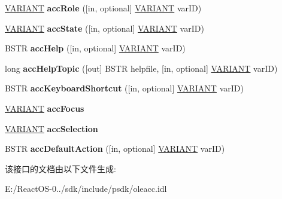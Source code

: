\begin{DoxyCompactItemize}
\mbox{\label{interface_i_accessible_a6944b25c49a0bbd468c0913894962a80}} 
\hyperlink{structtag_v_a_r_i_a_n_t}{V\+A\+R\+I\+A\+NT} {\bfseries acc\+Role} (\mbox{[}in, optional\mbox{]} \hyperlink{structtag_v_a_r_i_a_n_t}{V\+A\+R\+I\+A\+NT} var\+ID)
\item 
\mbox{\label{interface_i_accessible_a1ea262b68b4bf4f5802f343eeccb0ba7}} 
\hyperlink{structtag_v_a_r_i_a_n_t}{V\+A\+R\+I\+A\+NT} {\bfseries acc\+State} (\mbox{[}in, optional\mbox{]} \hyperlink{structtag_v_a_r_i_a_n_t}{V\+A\+R\+I\+A\+NT} var\+ID)
\item 
\mbox{\label{interface_i_accessible_adff5ec59aafb33b34195465f575bd0c7}} 
B\+S\+TR {\bfseries acc\+Help} (\mbox{[}in, optional\mbox{]} \hyperlink{structtag_v_a_r_i_a_n_t}{V\+A\+R\+I\+A\+NT} var\+ID)
\item 
\mbox{\label{interface_i_accessible_a4ef5d8e7ee5e0042b3e09d233e573913}} 
long {\bfseries acc\+Help\+Topic} (\mbox{[}out\mbox{]} B\+S\+TR helpfile, \mbox{[}in, optional\mbox{]} \hyperlink{structtag_v_a_r_i_a_n_t}{V\+A\+R\+I\+A\+NT} var\+ID)
\item 
\mbox{\label{interface_i_accessible_ae8f4f0c486ba1533b3909cd855b20e99}} 
B\+S\+TR {\bfseries acc\+Keyboard\+Shortcut} (\mbox{[}in, optional\mbox{]} \hyperlink{structtag_v_a_r_i_a_n_t}{V\+A\+R\+I\+A\+NT} var\+ID)
\item 
\mbox{\label{interface_i_accessible_a5a7350f081eab3bc0fc58f05cbdf5921}} 
\hyperlink{structtag_v_a_r_i_a_n_t}{V\+A\+R\+I\+A\+NT} {\bfseries acc\+Focus}
\item 
\mbox{\label{interface_i_accessible_aa39fcd5f5d224a25e3807812d42cecf5}} 
\hyperlink{structtag_v_a_r_i_a_n_t}{V\+A\+R\+I\+A\+NT} {\bfseries acc\+Selection}
\item 
\mbox{\label{interface_i_accessible_a6994dbe3cc0ddb30593a050bf3ac7491}} 
B\+S\+TR {\bfseries acc\+Default\+Action} (\mbox{[}in, optional\mbox{]} \hyperlink{structtag_v_a_r_i_a_n_t}{V\+A\+R\+I\+A\+NT} var\+ID)
\end{DoxyCompactItemize}


该接口的文档由以下文件生成\+:\begin{DoxyCompactItemize}
\item 
E\+:/\+React\+O\+S-\/0../sdk/include/psdk/oleacc.\+idl\end{DoxyCompactItemize}
